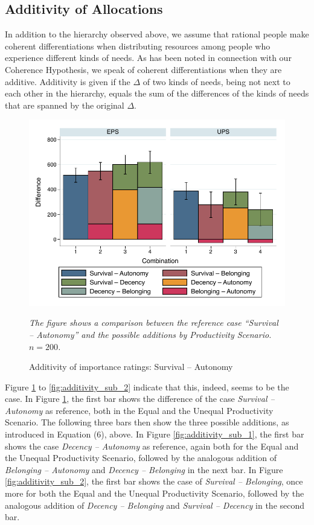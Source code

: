 \documentclass[egregdoesnotlikesansseriftitles]{scrartcl}
\begin{document}
\subsection{Additivity of Allocations}\label{sec:results_additivity}
In addition to the hierarchy observed above, we assume that rational people make coherent differentiations when distributing resources among people who experience different kinds of needs.
As has been noted in connection with our Coherence Hypothesis, we speak of coherent differentiations when they are additive.
Additivity is given if the $\Delta$ of two kinds of needs, being not next to each other in the hierarchy, equals the sum of the differences of the kinds of needs that are spanned by the original $\Delta$.

\begin{figure}[t]
   \centering
   \includegraphics[width=.75\textwidth]{figures/figure_6.pdf}
   \begin{minipage}{0.75\linewidth}
   \footnotesize
   \emph{The figure shows a comparison between the reference case ``Survival -- Autonomy'' and the possible additions by Productivity Scenario. $n = 200$.}
   \end{minipage}	
   \caption{Additivity of importance ratings: Survival -- Autonomy}
   \label{fig:additivity_all}
\end{figure}

Figure \ref{fig:additivity_all} to \ref{fig:additivity_sub_2} indicate that this, indeed, seems to be the case.
In Figure \ref{fig:additivity_all}, the first bar shows the difference of the case \textit{Survival -- Autonomy} as reference, both in the Equal and the Unequal Productivity Scenario.
The following three bars then show the three possible additions, as introduced in Equation (6), above.
In Figure \ref{fig:additivity_sub_1}, the first bar shows the case \textit{Decency -- Autonomy} as reference, again both for the Equal and the Unequal Productivity Scenario, followed by the analogous addition of \textit{Belonging -- Autonomy} and \textit{Decency -- Belonging} in the next bar.
In Figure \ref{fig:additivity_sub_2}, the first bar shows the case of \textit{Survival -- Belonging}, once more for both the Equal and the Unequal Productivity Scenario, followed by the analogous addition of \textit{Decency -- Belonging} and \textit{Survival -- Decency} in the second bar.
\end{document}
